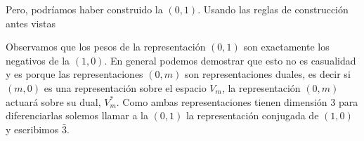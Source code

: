 \documentclass[12pt]{article}
\begin{document}
Pero, podríamos haber construido la $(0,1)$. Usando las reglas de construcción antes vistas 
\begin{center}
\end{center}

Observamos que los pesos de la representación $(0,1)$ son exactamente los negativos de la $(1,0)$. En general podemos demostrar que esto no es casualidad y es porque las representaciones $(0,m)$ son representaciones duales, es decir si $(m,0)$ es una representación sobre el espacio $V_m$, la representación $(0,m)$ actuará sobre su dual, $V_m^{*}$. Como ambas representaciones tienen dimensión $3$ para diferenciarlas solemos llamar a la $(0,1)$ la representación conjugada de $(1,0)$ y escribimos $\bar {3}$.
\end{document}
